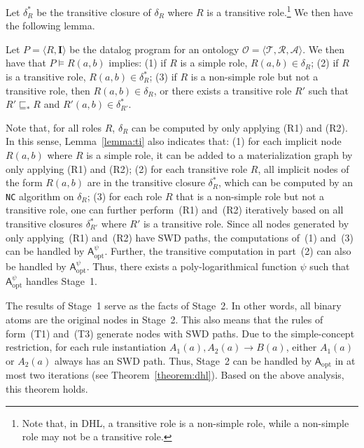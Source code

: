 Let $\delta^*_R$ be the transitive closure of $\delta_R$ where $R$ is a transitive role.\footnote{Note that,
in DHL, a transitive role is a non-simple role, while a non-simple role may not be a transitive role.}
We then have the following lemma.

\begin{lemma}\label{lemma:ti}
  Let
    $P=\langle R, \textbf{I}\rangle$ be the datalog program for an
    ontology
    $\mathcal{O}=\langle\mathcal{T},\mathcal{R},\mathcal{A}\rangle$. We
  then have that
  $P\models R(a,b)$ implies: (1) if $R$ is a simple role,
  $R(a,b)\in\delta_R$; (2) if $R$ is a transitive role,
  $R(a,b)\in\delta^*_{R}$; (3) if $R$ is a non-simple role but not a transitive role, then
  $R(a,b)\in\delta_R$, or there exists a transitive role $R'$ such
  that $R'\sqsubseteq_* R$ and $R'(a,b)\in\delta^*_{R'}$.
\end{lemma}

Note that, for all roles $R$, $\delta_R$ can be computed by only applying (R1) and (R2).
In this sense, Lemma~\ref{lemma:ti} also indicates that:
(1) for each implicit node $R(a,b)$ where $R$ is a simple role,
it can be added to a materialization graph by only applying (R1) and (R2);
(2) for each transitive role $R$, all implicit nodes of the form $R(a,b)$ are in the transitive closure $\delta^*_{R}$,
which can be computed by an \texttt{NC} algorithm on $\delta_{R}$;
(3) for each role $R$ that is a non-simple role but not a transitive role,
one can further perform~(R1) and~(R2) iteratively based on all transitive closures $\delta^*_{R'}$
where $R'$ is a transitive role.
Since all nodes generated by only applying~(R1) and~(R2) have SWD paths,
the computations of~(1) and~(3) can be handled by $\mathsf{A}_{\text{opt}}^\psi$.
Further, the transitive computation in part~(2) can also be handled by $\mathsf{A}_{\text{opt}}^\psi$.
Thus, there exists a poly-logarithmical function $\psi$
such that $\mathsf{A}_{\text{opt}}^\psi$ handles Stage~1.

The results of Stage~1 serve as the facts of Stage~2. In other words, all binary atoms
are the original nodes in Stage~2. This also means that the rules of form~(T1) and~(T3)
generate nodes with SWD paths. Due to the simple-concept restriction, for each rule
instantiation $A_1(a),A_2(a)\rightarrow B(a)$, either $A_1(a)$ or $A_2(a)$ always has an SWD path.
Thus, Stage~2 can be handled by $\mathsf{A}_{\text{opt}}$ in at most two iterations (see Theorem~\ref{theorem:dhl}).
Based on the above analysis, this theorem holds.

